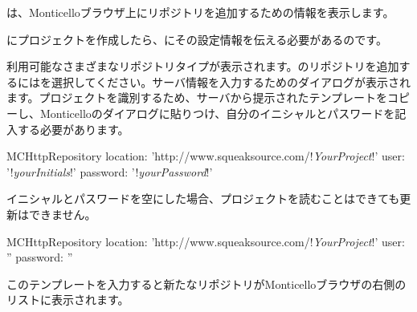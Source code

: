 \documentclass[a4paper,10pt,twoside]{book}
\begin{document}
\sqsrc は、Monticelloブラウザ上にリポジトリを追加するための情報を表示します。

\sqsrc にプロジェクトを作成したら、\pharo にその設定情報を伝える必要があるのです。

利用可能なさまざまなリポジトリタイプが表示されます。\sqsrc のリポジトリを追加するにはを選択してください。サーバ情報を入力するためのダイアログが表示されます。\sqsrc プロジェクトを識別するため、サーバから提示されたテンプレートをコピーし、Monticelloのダイアログに貼りつけ、自分のイニシャルとパスワードを記入する必要があります。

\begin{code}{}
MCHttpRepository
    location: 'http://www.squeaksource.com/!\emph{YourProject}!'
    user: '!\emph{yourInitials}!'
    password: '!\emph{yourPassword}!'
\end{code}

\noindent
イニシャルとパスワードを空にした場合、プロジェクトを読むことはできても更新はできません。

\begin{code}{}
MCHttpRepository
    location: 'http://www.squeaksource.com/!\emph{YourProject}!'
    user: ''
    password: ''
\end{code}

このテンプレートを入力すると新たなリポジトリがMonticelloブラウザの右側のリストに表示されます。
\end{document}
